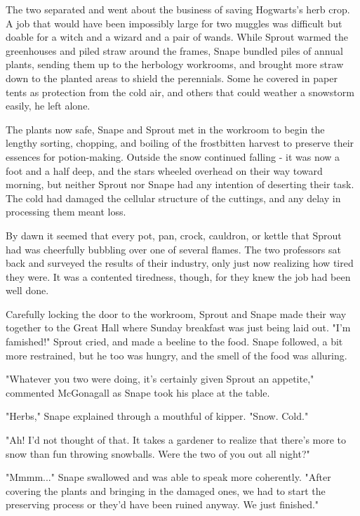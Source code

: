 \documentclass[a4paper,11pt]{article}
\begin{document}
The two separated and went about the business of saving Hogwarts's herb crop. A job that would have been impossibly large for two muggles was difficult but doable for a witch and a wizard and a pair of wands. While Sprout warmed the greenhouses and piled straw around the frames, Snape bundled piles of annual plants, sending them up to the herbology workrooms, and brought more straw down to the planted areas to shield the perennials. Some he covered in paper tents as protection from the cold air, and others that could weather a snowstorm easily, he left alone.

The plants now safe, Snape and Sprout met in the workroom to begin the lengthy sorting, chopping, and boiling of the frostbitten harvest to preserve their essences for potion-making. Outside the snow continued falling - it was now a foot and a half deep, and the stars wheeled overhead on their way toward morning, but neither Sprout nor Snape had any intention of deserting their task. The cold had damaged the cellular structure of the cuttings, and any delay in processing them meant loss.

By dawn it seemed that every pot, pan, crock, cauldron, or kettle that Sprout had was cheerfully bubbling over one of several flames. The two professors sat back and surveyed the results of their industry, only just now realizing how tired they were. It was a contented tiredness, though, for they knew the job had been well done.

Carefully locking the door to the workroom, Sprout and Snape made their way together to the Great Hall where Sunday breakfast was just being laid out. "I'm famished!" Sprout cried, and made a beeline to the food. Snape followed, a bit more restrained, but he too was hungry, and the smell of the food was alluring.

"Whatever you two were doing, it's certainly given Sprout an appetite," commented McGonagall as Snape took his place at the table.

"Herbs," Snape explained through a mouthful of kipper. "Snow. Cold."

"Ah! I'd not thought of that. It takes a gardener to realize that there's more to snow than fun throwing snowballs. Were the two of you out all night?"

"Mmmm..." Snape swallowed and was able to speak more coherently. "After covering the plants and bringing in the damaged ones, we had to start the preserving process or they'd have been ruined anyway. We just finished."
\end{document}
